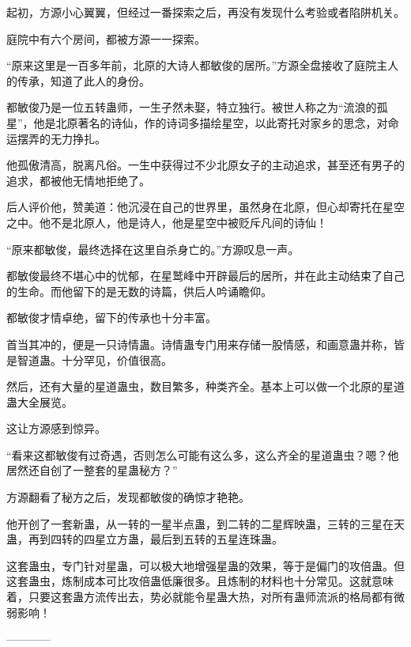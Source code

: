 \begin{this_body}
起初，方源小心翼翼，但经过一番探索之后，再没有发现什么考验或者陷阱机关。

庭院中有六个房间，都被方源一一探索。

“原来这里是一百多年前，北原的大诗人都敏俊的居所。”方源全盘接收了庭院主人的传承，知道了此人的身份。

都敏俊乃是一位五转蛊师，一生孑然未娶，特立独行。被世人称之为“流浪的孤星”，他是北原著名的诗仙，作的诗词多描绘星空，以此寄托对家乡的思念，对命运摆弄的无力挣扎。

他孤傲清高，脱离凡俗。一生中获得过不少北原女子的主动追求，甚至还有男子的追求，都被他无情地拒绝了。

后人评价他，赞美道：他沉浸在自己的世界里，虽然身在北原，但心却寄托在星空之中。他不是北原人，他是诗人，他是星空中被贬斥凡间的诗仙！

“原来都敏俊，最终选择在这里自杀身亡的。”方源叹息一声。

都敏俊最终不堪心中的忧郁，在星鹫峰中开辟最后的居所，并在此主动结束了自己的生命。而他留下的是无数的诗篇，供后人吟诵瞻仰。

都敏俊才情卓绝，留下的传承也十分丰富。

首当其冲的，便是一只诗情蛊。诗情蛊专门用来存储一股情感，和画意蛊并称，皆是智道蛊。十分罕见，价值很高。

然后，还有大量的星道蛊虫，数目繁多，种类齐全。基本上可以做一个北原的星道蛊大全展览。

这让方源感到惊异。

“看来这都敏俊有过奇遇，否则怎么可能有这么多，这么齐全的星道蛊虫？嗯？他居然还自创了一整套的星蛊秘方？”

方源翻看了秘方之后，发现都敏俊的确惊才艳艳。

他开创了一套新蛊，从一转的一星半点蛊，到二转的二星辉映蛊，三转的三星在天蛊，再到四转的四星立方蛊，最后到五转的五星连珠蛊。

这套蛊虫，专门针对星蛊，可以极大地增强星蛊的效果，等于是偏门的攻倍蛊。但这套蛊虫，炼制成本可比攻倍蛊低廉很多。且炼制的材料也十分常见。这就意味着，只要这套蛊方流传出去，势必就能令星蛊大热，对所有蛊师流派的格局都有微弱影响！

------------

\end{this_body}

